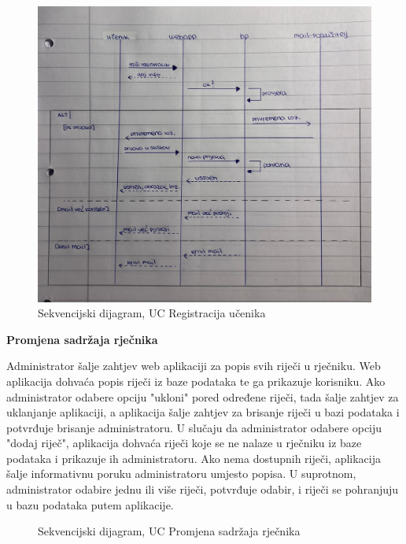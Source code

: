 \begin{figure}[H]
	\includegraphics[scale=0.20]{SekvencijskiDijg_slike/RegistracijaUcenika.jpeg} 
	\centering
	\caption{Sekvencijski dijagram, UC Registracija učenika}
	\label{fig:uc-registracija}
	
\end{figure}

\textbf{{Promjena sadržaja rječnika}}\


Administrator šalje zahtjev web aplikaciji za popis svih riječi u rječniku. Web aplikacija 
dohvaća popis riječi iz baze podataka te ga prikazuje korisniku. Ako administrator 
odabere opciju "ukloni" pored određene riječi, tada šalje zahtjev za uklanjanje aplikaciji, 
a aplikacija šalje zahtjev za brisanje riječi u bazi podataka i potvrđuje brisanje 
administratoru. U slučaju da administrator odabere opciju "dodaj riječ", aplikacija 
dohvaća riječi koje se ne nalaze u rječniku iz baze podataka i prikazuje ih 
administratoru. Ako nema dostupnih riječi, aplikacija šalje informativnu poruku 
administratoru umjesto popisa. U suprotnom, administrator odabire jednu ili više riječi, 
potvrđuje odabir, i riječi se pohranjuju u bazu podataka putem aplikacije.

\begin{figure}[H] 
	\centering
	\caption{Sekvencijski dijagram, UC Promjena sadržaja rječnika}
	\label{fig:uc-promjena sadržaja rječnika}
	
\end{figure}


